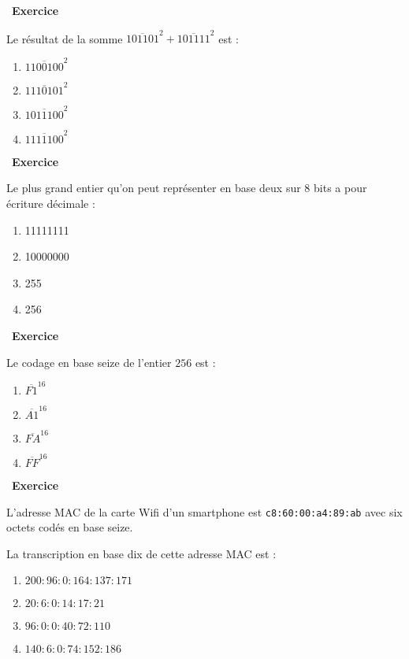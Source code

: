 \documentclass[
  11pt,
]{article}
\providecommand{\tightlist}{%
  \setlength{\itemsep}{0pt}\setlength{\parskip}{0pt}}
\newcounter{exo}
\newenvironment{exercice}[1]
{\par \medskip   \addtocounter{exo}{1} \noindent  
\begin{bclogo}[arrondi =0.1,   noborder = true, logo=\bccrayon, marge=4]{~\textbf{Exercice} \textbf{\theexo} {\itshape #1} }  \par}
{
\end{bclogo}
 \par \bigskip }
\newcounter{def}
\begin{document}
\begin{exercice}{}

Le résultat de la somme
\(\overline{101101}^{2} + \overline{101111}^{2}\) est :

\begin{enumerate}
\def\labelenumi{\arabic{enumi}.}
\tightlist
\item
  \(\overline{1100100}^{2}\)
\item
  \(\overline{1110101}^{2}\)
\item
  \(\overline{1011100}^{2}\)
\item
  \(\overline{1111100}^{2}\)
\end{enumerate}

\end{exercice}

\begin{exercice}{}

Le plus grand entier qu'on peut représenter en base deux sur 8 bits a
pour écriture décimale :

\begin{enumerate}
\def\labelenumi{\arabic{enumi}.}
\tightlist
\item
  11111111
\item
  10000000
\item
  255
\item
  256
\end{enumerate}

\end{exercice}

\begin{exercice}{}

Le codage en base seize de l'entier \(256\) est :

\begin{enumerate}
\def\labelenumi{\arabic{enumi}.}
\tightlist
\item
  \(\overline{F1}^{16}\)
\item
  \(\overline{A1}^{16}\)
\item
  \(\overline{FA}^{16}\)
\item
  \(\overline{FF}^{16}\)
\end{enumerate}

\end{exercice}

\begin{exercice}{}

L'adresse MAC de la carte Wifi d'un smartphone est
\texttt{c8:60:00:a4:89:ab} avec six octets codés en base seize.

La transcription en base dix de cette adresse MAC est :

\begin{enumerate}
\def\labelenumi{\arabic{enumi}.}
\tightlist
\item
  \(200:96:0:164:137:171\)
\item
  \(20:6:0:14:17:21\)
\item
  \(96:0:0:40:72:110\)
\item
  \(140:6:0:74:152:186\)
\end{enumerate}

\end{exercice}
\end{document}
